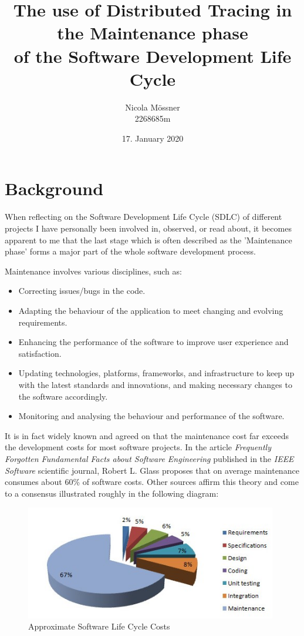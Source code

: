 \documentclass[11pt]{article}
\title{The use of Distributed Tracing in the Maintenance phase\\of the Software Development Life Cycle}
\author{Nicola M\"{o}ssner \\ 2268685m}
\date{17. January 2020}
\begin{document}
\maketitle

\section{Background}


When reflecting on the Software Development Life Cycle (SDLC) of different projects I have personally been involved in, observed, or read about, it becomes apparent to me that the last stage which is often described as the 'Maintenance phase' forms a major part of the whole software development process.

Maintenance involves various disciplines, such as: %
\begin{itemize}
    \item Correcting issues/bugs in the code.
    \item Adapting the behaviour of the application to meet changing and evolving requirements.
    \item Enhancing the performance of the software to improve user experience and satisfaction.
    \item Updating technologies, platforms, frameworks, and infrastructure to keep up with the latest standards and innovations, and making necessary changes to the software accordingly.
    \item Monitoring and analysing the behaviour and performance of the software.
\end{itemize}
It is in fact widely known and agreed on that the maintenance cost far exceeds the development costs for most software projects. In the article \textit{Frequently Forgotten Fundamental Facts about Software Engineering} \cite{ieeesoftware} published in the \textit{IEEE Software} scientific journal, Robert L. Glass proposes that on average maintenance consumes about 60\% of software costs. Other sources affirm this theory and come to a consensus illustrated roughly in the following diagram:

\begin{figure}[H]
    \includegraphics[width=11cm]{maintenance_costs}
    \centering
    \caption{Approximate Software Life Cycle Costs}
    \label{fig:maintenance_costs}
\end{figure}
\end{document}
